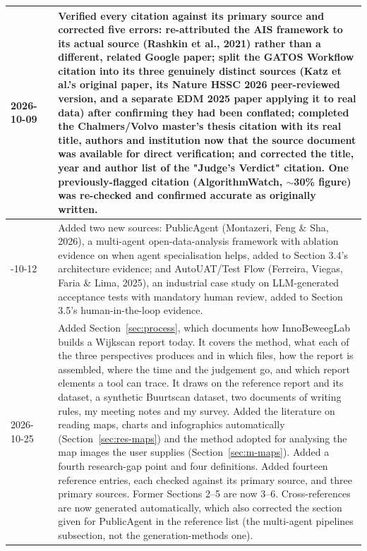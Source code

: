 \begin{longtable}{|>{\raggedright\arraybackslash}p{2.1cm}|>{\centering\arraybackslash}p{1.4cm}|>{\raggedright\arraybackslash}p{10.9cm}|}
\rowcolor{light}
2026-10-09 & 10 & Verified every citation against its primary source and corrected five errors: re-attributed the AIS framework to its actual source (Rashkin et al., 2021) rather than a different, related Google paper; split the GATOS Workflow citation into its three genuinely distinct sources (Katz et al.'s original paper, its Nature HSSC 2026 peer-reviewed version, and a separate EDM 2025 paper applying it to real data) after confirming they had been conflated; completed the Chalmers/Volvo master's thesis citation with its real title, authors and institution now that the source document was available for direct verification; and corrected the title, year and author list of the "Judge's Verdict" citation. One previously-flagged citation (AlgorithmWatch, $\sim$30\% figure) was re-checked and confirmed accurate as originally written. \\ \hline
2026-10-12 & 11 & Added two new sources: PublicAgent (Montazeri, Feng \& Sha, 2026), a multi-agent open-data-analysis framework with ablation evidence on when agent specialisation helps, added to Section 3.4's architecture evidence; and AutoUAT/Test Flow (Ferreira, Viegas, Faria \& Lima, 2025), an industrial case study on LLM-generated acceptance tests with mandatory human review, added to Section 3.5's human-in-the-loop evidence. \\ \hline
\rowcolor{light}
2026-10-25 & 12 & Added Section~\ref{sec:process}, which documents how InnoBeweegLab builds a Wijkscan report today. It covers the method, what each of the three perspectives produces and in which files, how the report is assembled, where the time and the judgement go, and which report elements a tool can trace. It draws on the reference report and its dataset, a synthetic Buurtscan dataset, two documents of writing rules, my meeting notes and my survey. Added the literature on reading maps, charts and infographics automatically (Section~\ref{sec:res-maps}) and the method adopted for analysing the map images the user supplies (Section~\ref{sec:m-maps}). Added a fourth research-gap point and four definitions. Added fourteen reference entries, each checked against its primary source, and three primary sources. Former Sections 2--5 are now 3--6. Cross-references are now generated automatically, which also corrected the section given for PublicAgent in the reference list (the multi-agent pipelines subsection, not the generation-methods one). \\ \hline
\end{longtable}
\endgroup